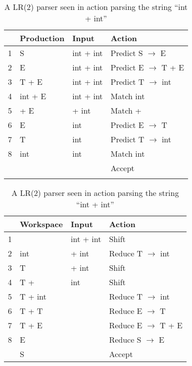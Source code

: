 \begin{table}
	\parbox{.45\linewidth}{
		\centering
    	\begin{tabular}{| l | l | l | l |}                             \hline
      	  & Production & Input      & Action                        \\ \hline
    	1 & S          & int + int  & Predict S $\rightarrow$ E     \\ 
    	2 & E          & int + int  & Predict E $\rightarrow$ T + E \\ 
    	3 & T + E      & int + int  & Predict T $\rightarrow$ int   \\
    	4 & int + E    & int + int  & Match int                     \\ 
    	5 & + E        & + int      & Match +                       \\ 
    	6 & E          & int        & Predict E $\rightarrow$ T     \\ 
    	7 & T          & int        & Predict T $\rightarrow$ int   \\
    	8 & int        & int        & Match int                     \\ 
      	  &            &            & Accept                        \\ \hline
      	\label{table:LL1}
    	\end{tabular}
	}
	\hfill
	\parbox{.45\linewidth}{
		\centering
    	\begin{tabular}{| l | l | l | l |}                              \hline
     	  & Workspace  & Input      & Action                         \\ \hline
    	1 &            & int + int  & Shift                          \\ 
    	2 & int        & + int      & Reduce T $\rightarrow$ int     \\ 
    	3 & T          & + int      & Shift                          \\
    	4 & T +        & int        & Shift                          \\ 
    	5 & T + int    &            & Reduce T $\rightarrow$ int     \\ 
   	 	6 & T + T      &            & Reduce E $\rightarrow$ T       \\ 
   		7 & T + E      &            & Reduce E $\rightarrow$ T + E   \\
    	8 & E          &            & Reduce S $\rightarrow$ E       \\ 
      	  & S          &            & Accept                         \\ \hline
    	\end{tabular}
    \label{table:LR2}
    \caption{A LR(2) parser seen in action parsing the string ``int + int''}
    }
\end{table}

